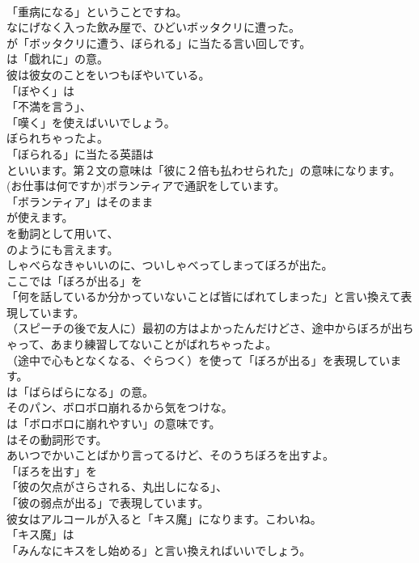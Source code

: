 \documentclass[8pt]{extreport}
\begin{document}
\begin{CJK}{UTF8}{min}
\\	「重病になる」ということですね。	
\\	なにげなく入った飲み屋で、ひどいボッタクリに遭った。 
\\	が「ボッタクリに遭う、ぼられる」に当たる言い回しです。
\\	は「戯れに」の意。	
\\	彼は彼女のことをいつもぼやいている。 
\\	「ぼやく」は
\\	「不満を言う」、
\\	「嘆く」を使えばいいでしょう。	
\\	ぼられちゃったよ。 
\\	「ぼられる」に当たる英語は
\\	といいます。第２文の意味は「彼に２倍も払わせられた」の意味になります。	
\\	(お仕事は何ですか)ボランティアで通訳をしています。 
\\	「ボランティア」はそのまま
\\	が使えます。
\\	を動詞として用いて、
\\	のようにも言えます。	
\\	しゃべらなきゃいいのに、ついしゃべってしまってぼろが出た。 
\\	ここでは「ぼろが出る」を
\\	「何を話しているか分かっていないことば皆にばれてしまった」と言い換えて表現しています。	
\\	（スピーチの後で友人に）最初の方はよかったんだけどさ、途中からぼろが出ちゃって、あまり練習してないことがばれちゃったよ。 
\\	（途中で心もとなくなる、ぐらつく）を使って「ぼろが出る」を表現しています。
\\	は「ばらばらになる」の意。	
\\	そのパン、ボロボロ崩れるから気をつけな。 
\\	は「ボロボロに崩れやすい」の意味です。
\\	はその動詞形です。	
\\	あいつでかいことばかり言ってるけど、そのうちぼろを出すよ。 
\\	「ぼろを出す」を
\\	「彼の欠点がさらされる、丸出しになる」、
\\	「彼の弱点が出る」で表現しています。	
\\	彼女はアルコールが入ると「キス魔」になります。こわいね。 
\\	「キス魔」は
\\	「みんなにキスをし始める」と言い換えればいいでしょう。	

\end{CJK}
\end{document}
